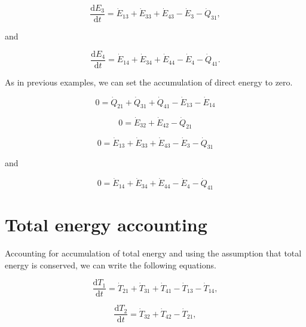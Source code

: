 \begin{equation} \label{eq:D-CV_E_dot_3}
	\frac{\mathrm{d}E_{3}}{\mathrm{d}t} 	 = \dot{E}_{13} + \dot{E}_{33} + \dot{E}_{43} - \dot{E}_{3} - \dot{Q}_{31},
\end{equation}

\noindent and 

\begin{equation} \label{eq:D-CV_E_dot_4}
	\frac{\mathrm{d}E_{4}}{\mathrm{d}t} 	 = \dot{E}_{14} + \dot{E}_{34} + \dot{E}_{44} - \dot{E}_{4} - \dot{Q}_{41}.
\end{equation}

As in previous examples, we can set the accumulation of direct energy to zero.

\begin{equation} \label{eq:D-CV_E_dot_1_SS}
	0 =  \dot{Q}_{21} + \dot{Q}_{31} + \dot{Q}_{41} - \dot{E}_{13} - \dot{E}_{14}
\end{equation}

\begin{equation} \label{eq:D-CV_E_dot_2_SS}
	0  = \dot{E}_{32}  + \dot{E}_{42} - \dot{Q}_{21}
\end{equation}

\begin{equation} \label{eq:D-CV_E_dot_3_SS}
	0 = \dot{E}_{13} + \dot{E}_{33} + \dot{E}_{43} - \dot{E}_{3} - \dot{Q}_{31}
\end{equation}

\noindent and 

\begin{equation} \label{eq:D-CV_E_dot_4_SS}
	0 = \dot{E}_{14} + \dot{E}_{34} + \dot{E}_{44} - \dot{E}_4 - \dot{Q}_{41}
\end{equation}


\section{Total energy accounting}

Accounting for accumulation of total energy and using the assumption that total energy is conserved, we can write the following equations.

\begin{equation} \label{eq:D-CV_T_1}
	\frac{\mathrm{d}T_{1}}{\mathrm{d}t} 	 = \dot{T}_{21} + \dot{T}_{31} + \dot{T}_{41} - \dot{T}_{13} - \dot{T}_{14},
\end{equation}

\begin{equation} \label{eq:D-CV_T_2}
	\frac{\mathrm{d}T_{2}}{\mathrm{d}t} 	 = \dot{T}_{32} + \dot{T}_{42} - \dot{T}_{21},
\end{equation}

